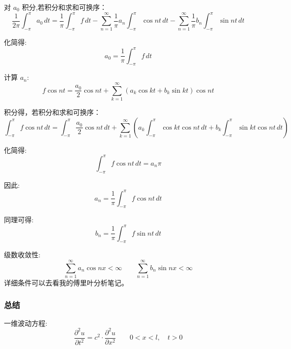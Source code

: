 \documentclass[12pt,a4paper]{article}
\numberwithin{subsection}{section}   %
\numberwithin{subsubsection}{subsection}
\theoremstyle{plain}
\theoremstyle{definition}
\theoremstyle{remark}
\theoremstyle{remark}
\begin{document}
	对 \( a_0 \) 积分,若积分和求和可换序：
	\begin{equation}
		\frac{1}{2\pi} \int_{-\pi}^{\pi} a_0 \, dt = \frac{1}{\pi} \int_{-\pi}^{\pi} f \, dt - \sum_{n=1}^{\infty} \frac{1}{\pi} a_n \int_{-\pi}^{\pi} \cos nt \, dt - \sum_{n=1}^{\infty} \frac{1}{\pi} b_n \int_{-\pi}^{\pi} \sin nt \, dt
	\end{equation}
	
	化简得:
	\begin{equation}
		a_0 = \frac{1}{\pi} \int_{-\pi}^{\pi} f \, dt
	\end{equation}
	
	计算 \( a_n \):
	\begin{equation}
		f \cos nt = \frac{a_0}{2} \cos nt + \sum_{k=1}^{\infty} \left( a_k \cos kt + b_k \sin kt \right) \cos nt
	\end{equation}
	
	积分得，若积分和求和可换序：
	\begin{equation}
		\int_{-\pi}^{\pi} f \cos nt \, dt = \int_{-\pi}^{\pi} \frac{a_0}{2} \cos nt \, dt + \sum_{k=1}^{\infty} \left( a_k \int_{-\pi}^{\pi} \cos kt \cos nt \, dt + b_k \int_{-\pi}^{\pi} \sin kt \cos nt \, dt \right)
	\end{equation}
	
	化简得:
	\begin{equation}
		\int_{-\pi}^{\pi} f \cos nt \, dt = a_n \pi
	\end{equation}
	
	因此:
	\begin{equation}
		a_n = \frac{1}{\pi} \int_{-\pi}^{\pi} f \cos nt \, dt
	\end{equation}
	
	同理可得:
	\begin{equation}
		b_n = \frac{1}{\pi} \int_{-\pi}^{\pi} f \sin nt \, dt
	\end{equation}
	
	级数收敛性:
	\begin{equation}
		\sum_{n=1}^{\infty} a_n \cos nx < \infty \qquad \sum_{n=1}^{\infty} b_n \sin nx < \infty
	\end{equation}
	详细条件可以去看我的傅里叶分析笔记。
	
	\subsubsection{总结}
	
	一维波动方程:
	\begin{equation}
		\frac{\partial^2 u}{\partial t^2} = c^2 \cdot \frac{\partial^2 u}{\partial x^2} \qquad 0 < x < l, \quad t > 0
	\end{equation}
	
\end{document}
